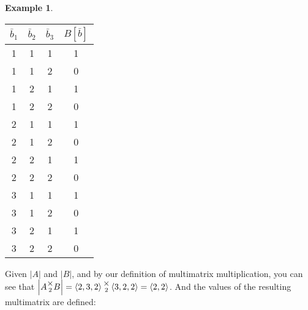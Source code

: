 \documentclass[12pt]{book}
\theoremstyle{plain}
\theoremstyle{definition}
\newtheorem{example}{Example}[chapter]
\theoremstyle{ppart}
\theoremstyle{case}
\theoremstyle{solution}
\newcommand{\mmult}[1]{\text{\raisebox{1ex}{$\underset{#1}{\times}$}}}
\newcommand{\shape}[1]{\left|#1\right|}
\begin{document}
\begin{example}
\begin{table}[h!]
\begin{center}
\begin{tabular}{c c c | c}
$\bar{b}_1$ & $\bar{b}_2$ & $\bar{b}_3$ & $B[\bar{b}]$ \\
\hline
1           & 1           & 1           & 1            \\
1           & 1           & 2           & 0            \\
1           & 2           & 1           & 1            \\
1           & 2           & 2           & 0            \\
2           & 1           & 1           & 1            \\
2           & 1           & 2           & 0            \\
2           & 2           & 1           & 1            \\
2           & 2           & 2           & 0            \\
3           & 1           & 1           & 1            \\
3           & 1           & 2           & 0            \\
3           & 2           & 1           & 1            \\
3           & 2           & 2           & 0
\end{tabular}
\end{center}
\end{table}

Given $\shape{A}$ and $\shape{B}$, and by our definition of multimatrix multiplication,
you can see that $\shape{A \mmult{2} B} = \left<2,3,2\right> \mmult{2} \left<3,2,2\right> = \left<2, 2\right>$. And the values of the
resulting multimatrix are defined:


\end{example}
\end{document}
